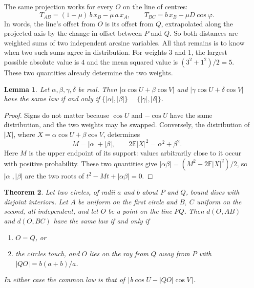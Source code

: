 \documentclass[11pt]{amsart}
\newtheorem{theorem}{Theorem}
\newtheorem{lemma}[theorem]{Lemma}
\theoremstyle{remark}
\newcommand{\E}{\mathbb{E}}
\begin{document}
The same projection works for every $O$ on the line of centres:
\begin{equation}\label{eq:T}
T_{AB}=(1+\mu)\,b\,x_B-\mu\,a\,x_A,\qquad T_{BC}=b\,x_B-\mu D\cos\varphi .
\end{equation}
In words, the line's offset from $O$ is its offset from $Q$, extrapolated along the projected axis by the change in offset between $P$ and $Q$. So both distances are weighted sums of two independent arcsine variables. All that remains is to know when two such sums agree in distribution. For weights $3$ and $1$, the largest possible absolute value is $4$ and the mean squared value is $(3^2+1^2)/2=5$. These two quantities already determine the two weights.

\begin{lemma}\label{lem:moments}
Let $\alpha,\beta,\gamma,\delta$ be real. Then $|\alpha\cos U+\beta\cos V|$ and $|\gamma\cos U+\delta\cos V|$ have the same law if and only if $\{|\alpha|,|\beta|\}=\{|\gamma|,|\delta|\}$.
\end{lemma}

\begin{proof}
Signs do not matter because $\cos U$ and $-\cos U$ have the same distribution, and the two weights may be swapped. Conversely, the distribution of $|X|$, where $X=\alpha\cos U+\beta\cos V$, determines
\[
M=|\alpha|+|\beta|,\qquad
2\E|X|^2=\alpha^2+\beta^2.
\]
Here $M$ is the upper endpoint of its support: values arbitrarily close to it occur with positive probability. These two quantities give $|\alpha\beta|=(M^2-2\E|X|^2)/2$, so $|\alpha|,|\beta|$ are the two roots of $t^2-Mt+|\alpha\beta|=0$.
\end{proof}

\begin{theorem}\label{thm:char}
Let two circles, of radii $a$ and $b$ about $P$ and $Q$, bound discs with disjoint interiors. Let $A$ be uniform on the first circle and $B$, $C$ uniform on the second, all independent, and let $O$ be a point on the line $PQ$. Then $d(O,AB)$ and $d(O,BC)$ have the same law if and only if
\begin{enumerate}
\item $O=Q$, or
\item the circles touch, and $O$ lies on the ray from $Q$ away from $P$ with $|QO|=b(a+b)/a$.
\end{enumerate}
In either case the common law is that of $|\,b\cos U-|QO|\cos V\,|$.
\end{theorem}
\end{document}
